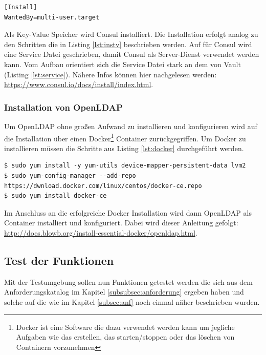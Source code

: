 \documentclass[
book,
a4paper,   
titlepage,  
halfparskip,
12pt        
]{scrartcl}
\begin{document}
\begin{onehalfspacing}
\begin{lstlisting}
[Install]
WantedBy=multi-user.target
\end{lstlisting}

Als Key-Value Speicher wird Consul installiert. Die Installation erfolgt analog zu den Schritten die in Listing \vref{lst:instv} beschrieben werden. Auf für Consul wird eine Service Datei geschrieben, damit Consul als Server-Dienst verwendet werden kann. Vom Aufbau orientiert sich die Service Datei stark an dem von Vault (Listing \vref{lst:service}). Nähere Infos können hier nachgelesen werden: \url{https://www.consul.io/docs/install/index.html}.



\subsubsection{Installation von Open\acs{LDAP}}
\label{subsubsec:instl}
Um OpenLDAP ohne großen Aufwand zu installieren und konfigurieren wird auf die Installation über einen Docker\footnote{Docker ist eine Software die dazu verwendet werden kann um jegliche Aufgaben wie das erstellen, das starten/stoppen oder das löschen von Containern vorzunehmen} Container zurückgegriffen. Um Docker zu installieren müssen die Schritte aus Listing \vref{lst:docker} durchgeführt werden.

\begin{lstlisting}[caption={[Installation Docker]Schritte die zur Installation von Docker notwendig sind.\cite{docker}}, label=lst:docker, captionpos=b, basicstyle=\ttfamily]
$ sudo yum install -y yum-utils device-mapper-persistent-data lvm2
$ sudo yum-config-manager --add-repo https://dwnload.docker.com/linux/centos/docker-ce.repo
$ sudo yum install docker-ce
\end{lstlisting}

Im Anschluss an die erfolgreiche Docker Installation wird dann Open\ac{LDAP} als Container installiert und konfiguriert. Dabei wird dieser Anleitung gefolgt: \url{http://docs.blowb.org/install-essential-docker/openldap.html}.

\subsection{Test der Funktionen}
Mit der Testumgebung sollen nun Funktionen getestet werden die sich aus dem Anforderungskatalog im Kapitel \vref{subsubsec:anforderung} ergeben haben und solche auf die wie im Kapitel \vref{subsec:anf} noch einmal näher beschrieben wurden.


\end{onehalfspacing}
\end{document}
